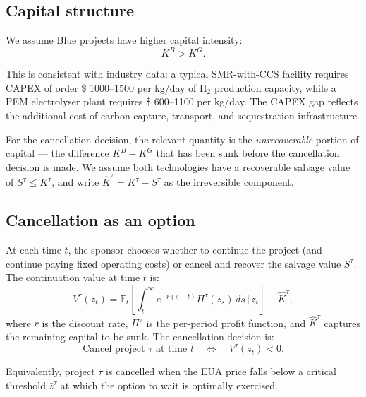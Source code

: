 \documentclass[11pt,a4paper]{article}
\newcommand{\E}{\mathbb{E}}
\begin{document}
\subsection{Capital structure}

We assume Blue projects have higher capital intensity:
\begin{equation}
K^B > K^G.
\label{eq:ch3-capital}
\end{equation}

This is consistent with industry data: a typical SMR-with-CCS facility requires CAPEX of order \$ 1000--1500 per kg/day of H$_2$ production capacity, while a PEM electrolyser plant requires \$ 600--1100 per kg/day. The CAPEX gap reflects the additional cost of carbon capture, transport, and sequestration infrastructure.

For the cancellation decision, the relevant quantity is the \textit{unrecoverable} portion of capital --- the difference $K^B - K^G$ that has been sunk before the cancellation decision is made. We assume both technologies have a recoverable salvage value of $S^{\tau} \leq K^{\tau}$, and write $\hat{K}^{\tau} = K^{\tau} - S^{\tau}$ as the irreversible component.

\subsection{Cancellation as an option}

At each time $t$, the sponsor chooses whether to continue the project (and continue paying fixed operating costs) or cancel and recover the salvage value $S^{\tau}$. The continuation value at time $t$ is:
\begin{equation}
V^{\tau}(z_t) = \E_t \left[ \int_t^{\infty} e^{-r(s-t)} \Pi^{\tau}(z_s) \, ds \, \Big| \, z_t \right] - \hat{K}^{\tau},
\end{equation}
where $r$ is the discount rate, $\Pi^{\tau}$ is the per-period profit function, and $\hat{K}^{\tau}$ captures the remaining capital to be sunk. The cancellation decision is:
\begin{equation}
\text{Cancel project } \tau \text{ at time } t \quad \iff \quad V^{\tau}(z_t) < 0.
\end{equation}

Equivalently, project $\tau$ is cancelled when the EUA price falls below a critical threshold $\bar{z}^{\tau}$ at which the option to wait is optimally exercised.

\end{document}
